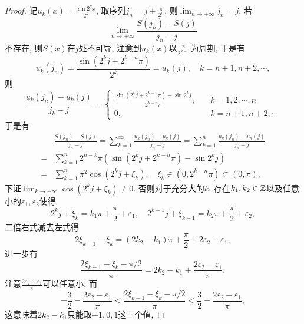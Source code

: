 \begin{quiza}
\begin{proof}
记\(u_k(x)=\frac{\sin 2^kx}{2^k}\), 取序列\(j_n=j+\frac{\pi}{2^n}\), 则\(\lim_{n\rightarrow+\infty}j_n=j\).  若\[\lim_{n\rightarrow+\infty}\frac{S(j_n)-S(j)}{j_n-j}\]不存在, 则\(S(x)\)在\(j\)处不可导, 注意到\(u_k(x)\)以\(\frac{\pi}{2^{k-1}}\)为周期, 于是有\[u_k(j_n)=\frac{\sin\left(2^kj+2^{k-n}\pi\right)}{2^k}=u_k(j),\quad k=n+1,n+2,\cdots,\]则\[\frac{u_k(j_n)-u_k(j)}{j_k-j}=\begin{cases}
\frac{\sin\left(2^kj+2^{k-n}\pi\right)-\sin 2^kj}{2^{k-n}\pi},\quad &k=1,2,\cdots,n\\
0,&k=n+1,n+2,\cdots
\end{cases}\]于是有\[\begin{split}
&\frac{S(j_n)-S(j)}{j_n-j}=\sum_{k=1}^{\infty}\frac{u_k(j_n)-u_k(j)}{j_n-j}=\sum_{k=1}^{n}\frac{u_k(j_n)-u_k(j)}{j_n-j}\\=&\sum_{k=1}^{n}2^{n-k}\pi\left(\sin\left(2^kj+2^{k-n}\pi\right)-\sin 2^kj\right)\\=&\sum_{k=1}^{n}\pi^2\cos\left(2^kj+\xi_k\right),\quad \xi_k\in\left(0,2^{k-n}\pi\right)\subset\left(0,\pi\right),
\end{split}\]
下证\(\lim_{k\rightarrow+\infty}\cos\left(2^kj+\xi_k\right)\ne 0\). 否则对于充分大的\(k\), 存在\(k_1,k_2\in\mathbb{Z}\)以及任意小的\(\varepsilon_1,\varepsilon_2\)使得\[2^kj+\xi_k=k_1\pi+\frac{\pi}{2}+\varepsilon_1,\quad 2^{k-1}j+\xi_{k-1}=k_2\pi+\frac{\pi}{2}+\varepsilon_2,\]二倍右式减去左式得\[2\xi_{k-1}-\xi_k=\left(2k_2-k_1\right)\pi+\frac{\pi}{2}+2\varepsilon_2-\varepsilon_1,\]进一步有\[\frac{2\xi_{k-1}-\xi_k-\pi/2}{\pi}=2k_2-k_1+\frac{2\varepsilon_2-\varepsilon_1}{\pi},\]注意\(\frac{2\varepsilon_2-\varepsilon_1}{\pi}\)可以任意小, 而\[-\frac{3}{2}-\frac{2\varepsilon_2-\varepsilon_1}{\pi}<\frac{2\xi_{k-1}-\xi_k-\pi/2}{\pi}<\frac{3}{2}-\frac{2\varepsilon_2-\varepsilon_1}{\pi},\]这意味着\(2k_2-k_1\)只能取\(-1,0,1\)这三个值,
\end{proof}
\end{quiza}
